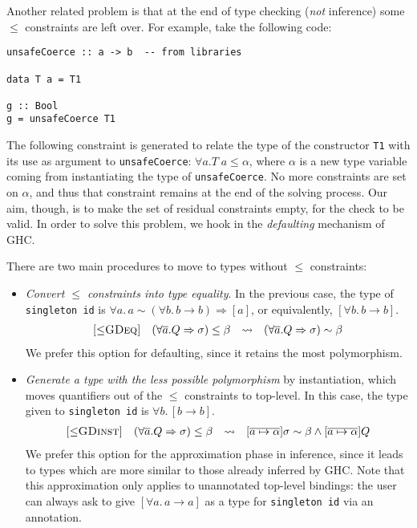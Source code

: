 \documentclass[12pt]{article}
\begin{document}
Another related problem is that at the end of type checking (\emph{not} inference) some $\leq$ constraints are left over. For example, take the following code:
\begin{verbatim}
unsafeCoerce :: a -> b  -- from libraries

data T a = T1

g :: Bool
g = unsafeCoerce T1
\end{verbatim}
The following constraint is generated to relate the type of the constructor {\tt T1} with its use as argument to {\tt unsafeCoerce}: $\forall a. T \; a \leq \alpha$, where $\alpha$ is a new type variable coming from instantiating the type of {\tt unsafeCoerce}. No more constraints are set on $\alpha$, and thus that constraint remains at the end of the solving process. Our aim, though, is to make the set of residual constraints empty, for the check to be valid. In order to solve this problem, we hook in the \emph{defaulting} mechanism of GHC.

\vspace{0.2cm}

\noindent There are two main procedures to move to types without $\leq$ constraints:
\begin{itemize}
\item \emph{Convert $\leq$ constraints into type equality}. In the previous case, the type of {\tt singleton id} is $\forall a. \, a \sim (\forall b. \, b \to b) \Rightarrow [a]$, or equivalently, $[\forall b. \, b \to b]$.
$$
\begin{array}{lrcl}
\textsc{[$\leq$GDeq]} & (\forall \overline{a}. Q \Rightarrow \sigma) \leq \beta & \leadsto & (\forall \overline{a}. Q \Rightarrow \sigma) \sim \beta
\end{array}
$$
We prefer this option for defaulting, since it retains the most polymorphism.
\item \emph{Generate a type with the less possible polymorphism} by instantiation, which moves quantifiers out of the $\leq$ constraints to top-level. In this case, the type given to {\tt singleton id} is $\forall b. \, [b \to b]$.
$$
\begin{array}{lrcl}
\textsc{[$\leq$GDinst]} & (\forall \overline{a}. Q \Rightarrow \sigma) \leq \beta & \leadsto & [\overline{a \mapsto \alpha}]\sigma \sim \beta \wedge [\overline{a \mapsto \alpha}]Q
\end{array}
$$
We prefer this option for the approximation phase in inference, since it leads to types which are more similar to those already inferred by GHC. Note that this approximation only applies to unannotated top-level bindings: the user can always ask to give $[\forall a. \, a \to a]$ as a type for {\tt singleton id} via an annotation.
\end{itemize}
\end{document}
